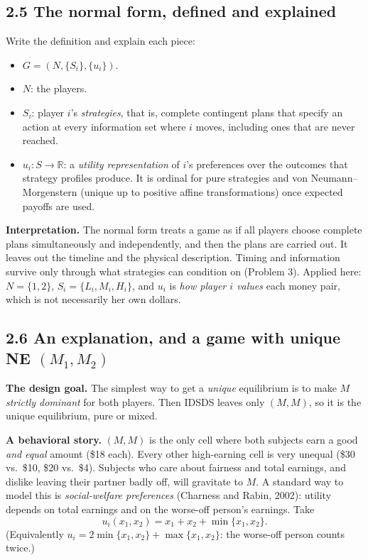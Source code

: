\documentclass[11pt]{article}
\begin{document}
\subsection*{2.5 The normal form, defined and explained}
Write the definition and explain each piece:
\begin{itemize}
\item $G=(N,\{S_i\},\{u_i\})$.
\item $N$: the players.
\item $S_i$: player $i$'s \emph{strategies}, that is, complete contingent plans that specify an action at every information set where $i$ moves, including ones that are never reached.
\item $u_i:S\to\mathbb{R}$: a \emph{utility representation} of $i$'s preferences over the outcomes that strategy profiles produce. It is ordinal for pure strategies and von Neumann--Morgenstern (unique up to positive affine transformations) once expected payoffs are used.
\end{itemize}
\textbf{Interpretation.} The normal form treats a game as if all players choose complete plans simultaneously and independently, and then the plans are carried out. It leaves out the timeline and the physical description. Timing and information survive only through what strategies can condition on (Problem 3). Applied here: $N=\{1,2\}$, $S_i=\{L_i,M_i,H_i\}$, and $u_i$ is \emph{how player $i$ values} each money pair, which is not necessarily her own dollars.

\subsection*{2.6 An explanation, and a game with unique NE $(M_1,M_2)$}
\textbf{The design goal.} The simplest way to get a \emph{unique} equilibrium is to make $M$ \emph{strictly dominant} for both players. Then IDSDS leaves only $(M,M)$, so it is the unique equilibrium, pure or mixed.

\textbf{A behavioral story.} $(M,M)$ is the only cell where both subjects earn a good \emph{and equal} amount (\$18 each). Every other high-earning cell is very unequal (\$30 vs.\ \$10, \$20 vs.\ \$4). Subjects who care about fairness and total earnings, and dislike leaving their partner badly off, will gravitate to $M$. A standard way to model this is \emph{social-welfare preferences} (Charness and Rabin, 2002): utility depends on total earnings and on the worse-off person's earnings. Take
\[
u_i(x_1,x_2)=x_1+x_2+\min\{x_1,x_2\}.
\]
(Equivalently $u_i=2\min\{x_1,x_2\}+\max\{x_1,x_2\}$: the worse-off person counts twice.)
\end{document}
